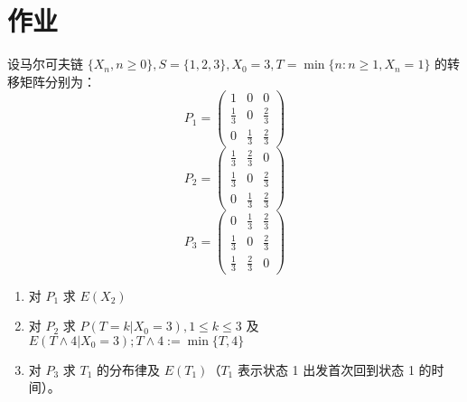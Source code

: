 \documentclass[lang=cn,10pt,thmcnt=section]{elegantbook}
\begin{document}
\section{作业}
\begin{example}
	设马尔可夫链 $\{X_n, n \geq 0\}, S = \{1, 2, 3\}, X_0 = 3, T = \min\{n: n \geq 1, X_n = 1\}$ 的转移矩阵分别为：
\[
P_1 = \begin{pmatrix}
1 & 0 & 0 \\
\frac{1}{3} & 0 & \frac{2}{3} \\
0 & \frac{1}{3} & \frac{2}{3}
\end{pmatrix}
\]
\[
P_2 = \begin{pmatrix}
\frac{1}{3} & \frac{2}{3} & 0 \\
\frac{1}{3} & 0 & \frac{2}{3} \\
0 & \frac{1}{3} & \frac{2}{3}
\end{pmatrix}
\]
\[
P_3 = \begin{pmatrix}
0 & \frac{1}{3} & \frac{2}{3} \\
\frac{1}{3} & 0 & \frac{2}{3} \\
\frac{1}{3} & \frac{2}{3} & 0
\end{pmatrix}
\]
\begin{enumerate}
    \item 对 $P_1$ 求 $E(X_2)$
    \item 对 $P_2$ 求 $P(T = k | X_0 = 3), 1 \leq k \leq 3$ 及 $E(T \land 4 | X_0 = 3); T \land 4 := \min\{T, 4\}$
    \item 对 $P_3$ 求 $T_1$ 的分布律及 $E(T_1)$（$T_1$ 表示状态 1 出发首次回到状态 1 的时间）。
\end{enumerate}
\end{example}
\end{document}
